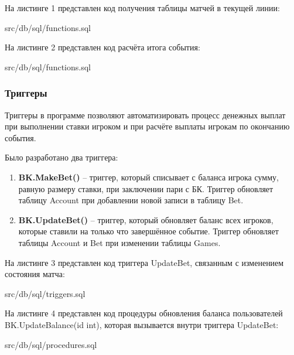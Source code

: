 На листинге 1 представлен код получения таблицы матчей в текущей линии:
\FloatBarrier
\begin{lstinputlisting}[language=SQL, caption=Получение таблицы матчей в текущей линии, linerange = {78-101},
	basicstyle=\footnotesize\ttfamily, frame=single, breaklines=true]{src/db/sql/functions.sql}
\end{lstinputlisting}
\FloatBarrier

\newpage
На листинге 2 представлен код расчёта итога события:
\FloatBarrier
\begin{lstinputlisting}[language=SQL, caption=Расчёт итога события, linerange = {127-151},
	basicstyle=\footnotesize\ttfamily, frame=single,breaklines=true]{src/db/sql/functions.sql}
\end{lstinputlisting}
\FloatBarrier

\subsubsection{Триггеры}
Триггеры в программе позволяют автоматизировать процесс денежных выплат при выполнении ставки игроком и при расчёте выплаты игрокам по окончанию события.

Было разработано два триггера:
\begin{enumerate}
	\item \textbf{BK.MakeBet()} -- триггер, который списывает с баланса игрока сумму, равную размеру ставки, при заключении пари с БК. Триггер обновляет таблицу Account при добавлении новой записи в таблицу Bet.
	\item \textbf{BK.UpdateBet()} -- триггер, который обновляет баланс всех игроков, которые ставили на только что завершённое событие. Триггер обновляет таблицы Account и Bet при изменении таблицы Games.
\end{enumerate}

На листинге 3 представлен код триггера UpdateBet, связанным с изменением состояния матча:
\FloatBarrier
\begin{lstinputlisting}[language=SQL, caption=Триггер на обновление таблицы Games, linerange = {24-50},
	basicstyle=\footnotesize\ttfamily, frame=single,breaklines=true]{src/db/sql/triggers.sql}
\end{lstinputlisting}
\FloatBarrier

\newpage
На листинге 4 представлен код процедуры обновления баланса пользователей BK.UpdateBalance(id int), которая вызывается внутри триггера UpdateBet:
\FloatBarrier
\begin{lstinputlisting}[language=SQL, caption=Обновление балансов пользователй, linerange = {112-134},
	basicstyle=\footnotesize\ttfamily, frame=single,breaklines=true]{src/db/sql/procedures.sql}
\end{lstinputlisting}
\FloatBarrier

